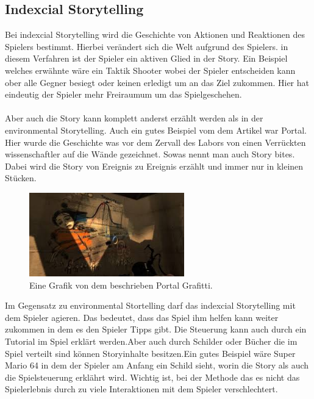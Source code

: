 \subsection{Indexcial Storytelling}
Bei indexcial Storytelling wird die Geschichte von Aktionen und Reaktionen des Spielers bestimmt. Hierbei verändert sich die Welt aufgrund des Spielers. in diesem Verfahren ist der Spieler ein aktiven Glied in der Story. Ein Beispiel welches  erwähnte wäre ein Taktik Shooter wobei der Spieler entscheiden kann ober alle Gegner besiegt oder keinen erledigt um an das Ziel zukommen. Hier hat eindeutig der Spieler mehr Freiraumum um das Spielgeschehen.\\\\
Aber auch die Story kann komplett anderst erzählt werden als in der environmental Storytelling. Auch ein gutes Beispiel vom dem Artikel  war Portal. Hier wurde die Geschichte was vor dem Zervall des Labors von einen Verrückten wissenschaftler auf die Wände gezeichnet. Sowas nennt man auch Story bites. Dabei wird die Story von Ereignis zu Ereignis erzählt und immer nur in kleinen Stücken.
\begin{figure}[H]
    \centering
    \includegraphics[width=0.6\textwidth]{chapters/15/images/Portal.png}
    \caption{Eine Grafik von dem beschrieben Portal Grafitti.}
    \label{UST-6}
\end{figure}
Im Gegensatz zu environmental Stortelling darf das indexcial Storytelling mit dem Spieler agieren. Das bedeutet, dass das Spiel ihm helfen kann weiter zukommen in dem es den Spieler Tipps gibt. Die Steuerung kann auch durch ein Tutorial im Spiel erklärt werden.Aber auch durch Schilder oder Bücher die im Spiel verteilt sind können Storyinhalte besitzen.Ein gutes Beispiel wäre Super Mario 64 in dem der Spieler am Anfang ein Schild sieht, worin die Story als auch die Spielsteuerung erklährt wird. Wichtig ist, bei der Methode das es nicht das Spielerlebnis durch zu viele Interaktionen mit dem Spieler verschlechtert. 

